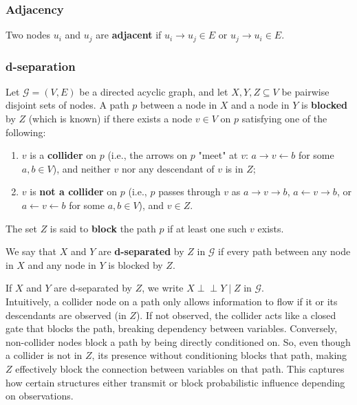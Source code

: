 \documentclass{article}
\newcommand{\indep}{\perp\!\!\!\!\perp}
\begin{document}
	\subsubsection*{Adjacency}
	Two nodes $u_i$ and $u_j$ are \textbf{adjacent} if $u_i \rightarrow u_j \in E$ or $u_j \rightarrow u_i \in E$.
	
	
	\subsubsection*{d-separation}
	
	Let $\mathcal{G} = (V, E)$ be a directed acyclic graph, and let $X, Y, Z \subseteq V$ be pairwise disjoint sets of nodes. A path $p$ between a node in $X$ and a node in $Y$ is \textbf{blocked} by $Z$ (which is known) if there exists a node $v \in V$ on $p$ satisfying one of the following:
	\begin{enumerate}
		\item $v$ is a \textbf{collider} on $p$ (i.e., the arrows on $p$ "meet" at $v$: $a \rightarrow v \leftarrow b$ for some $a, b \in V$), and neither $v$ nor any descendant of $v$ is in $Z$;
		\item $v$ is \textbf{not a collider} on $p$ (i.e., $p$ passes through $v$ as $a \rightarrow v \rightarrow b$, $a \leftarrow v \rightarrow b$, or $a \leftarrow v \leftarrow b$ for some $a, b \in V$), and $v \in Z$.
	\end{enumerate}
		
	The set $Z$ is said to \textbf{block} the path $p$ if at least one such $v$ exists. 
		
	We say that $X$ and $Y$ are \textbf{d-separated} by $Z$ in $\mathcal{G}$ if every path between any node in $X$ and any node in $Y$ is blocked by $Z$. 
	
	If $X$ and $Y$ are d-separated by $Z$, we write $X \indep Y \mid Z$ in $\mathcal{G}$. \\
	
	Intuitively, a collider node on a path only allows information to flow if it or its descendants are observed (in $Z$). If not observed, the collider acts like a closed gate that blocks the path, breaking dependency between variables. Conversely, non-collider nodes block a path by being directly conditioned on. So, even though a collider is not in $Z$, its presence without conditioning blocks that path, making $Z$ effectively block the connection between variables on that path. This captures how certain structures either transmit or block probabilistic influence depending on observations.
	
\end{document}
